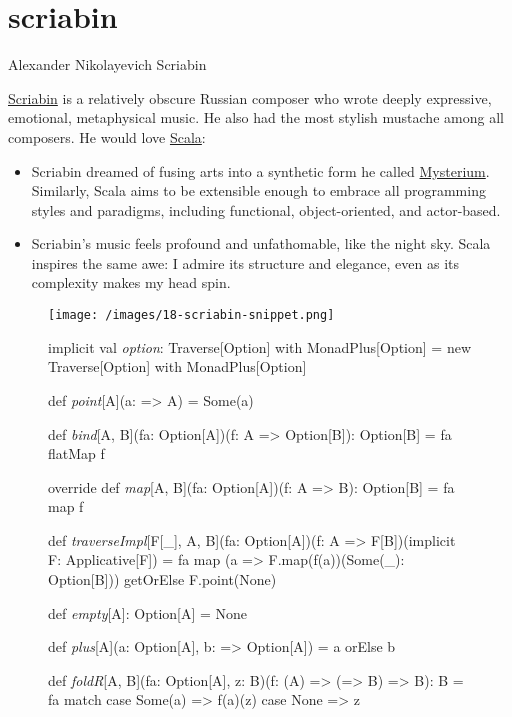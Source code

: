 \documentclass{article}
\begin{document}
\section{scriabin}{Alexander Nikolayevich Scriabin}

\href{https://en.wikipedia.org/wiki/Alexander_Scriabin}{Scriabin} is a relatively obscure Russian composer
who wrote deeply expressive, emotional, metaphysical music.
He also had the most stylish mustache among all composers.
He would love \href{https://scala-lang.org/}{Scala}:

\begin{itemize}
  \item
  Scriabin dreamed of fusing arts into a synthetic form he called \href{https://en.wikipedia.org/wiki/Mysterium_(Scriabin)}{Mysterium}.
  Similarly, Scala aims to be extensible enough to embrace all programming styles and paradigms, including functional, object-oriented, and actor-based.
  \item
  Scriabin's music feels profound and unfathomable, like the night sky.
  Scala inspires the same awe: I admire its structure and elegance, even as its complexity makes my head spin.
\end{itemize}

\begin{figure}[grayscale-diagram]
  \texttt{[image: /images/18-scriabin-snippet.png]}
\end{figure}
\begin{figure}
\begin{code}[scala]
implicit val \emph{option}: Traverse[Option] with MonadPlus[Option] =
  new Traverse[Option] with MonadPlus[Option] {
    def \emph{point}[A](a: => A) = Some(a)

    def \emph{bind}[A, B](fa: Option[A])(f: A => Option[B]): Option[B] = fa flatMap f

    override def \emph{map}[A, B](fa: Option[A])(f: A => B): Option[B] = fa map f

    def \emph{traverseImpl}[F[_], A, B](fa: Option[A])(f: A => F[B])(implicit F: Applicative[F]) =
      fa map (a => F.map(f(a))(Some(_): Option[B])) getOrElse F.point(None)

    def \emph{empty}[A]: Option[A] = None

    def \emph{plus}[A](a: Option[A], b: => Option[A]) = a orElse b

    def \emph{foldR}[A, B](fa: Option[A], z: B)(f: (A) => (=> B) => B): B = fa match {
      case Some(a) => f(a)(z)
      case None => z
    }
}
\end{code}
\end{figure}
\end{document}
